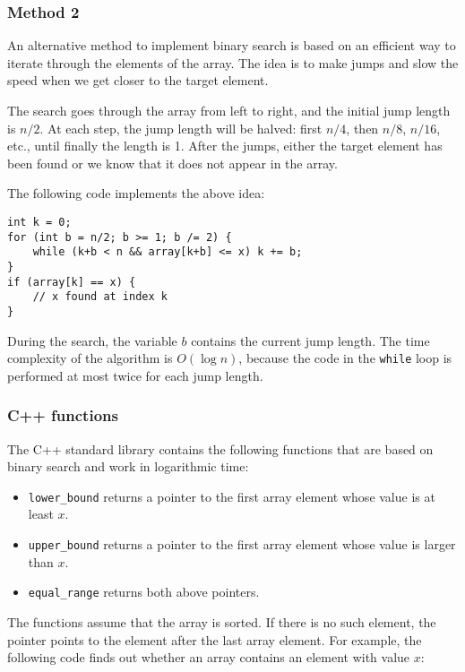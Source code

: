 \subsubsection{Method 2}

An alternative method to implement binary search
is based on an efficient way to iterate through
the elements of the array.
The idea is to make jumps and slow the speed
when we get closer to the target element.

The search goes through the array from left to
right, and the initial jump length is $n/2$.
At each step, the jump length will be halved:
first $n/4$, then $n/8$, $n/16$, etc., until
finally the length is 1.
After the jumps, either the target element has
been found or we know that it does not appear in the array.

The following code implements the above idea:
\begin{lstlisting}
int k = 0;
for (int b = n/2; b >= 1; b /= 2) {
    while (k+b < n && array[k+b] <= x) k += b;
}
if (array[k] == x) {
    // x found at index k
}
\end{lstlisting}

During the search, the variable $b$
contains the current jump length.
The time complexity of the algorithm is $O(\log n)$,
because the code in the \texttt{while} loop
is performed at most twice for each jump length.

\subsubsection{C++ functions}

The C++ standard library contains the following functions
that are based on binary search and work in logarithmic time:

\begin{itemize}
\item \texttt{lower\_bound} returns a pointer to the
first array element whose value is at least $x$.
\item \texttt{upper\_bound} returns a pointer to the
first array element whose value is larger than $x$.
\item \texttt{equal\_range} returns both above pointers.
\end{itemize}

The functions assume that the array is sorted.
If there is no such element, the pointer points to
the element after the last array element.
For example, the following code finds out whether
an array contains an element with value $x$:

